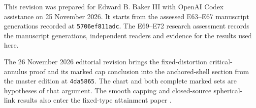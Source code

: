 \documentclass[11pt]{article}
\numberwithin{equation}{section}
\theoremstyle{definition}
\theoremstyle{remark}
\begin{document}
This revision was prepared for Edward B. Baker III with OpenAI Codex
assistance on 25 November 2026. It starts from the assessed E63--E67 manuscript generations
recorded at \texttt{5706ef811adc}. The E69--E72 research assessment
records the manuscript generations, independent readers and evidence
for the results used here.

The 26 November 2026 editorial revision brings the fixed-distortion
critical-annulus proof and its marked cap conclusion into the
anchored-shell section from the master edition at \texttt{4da5865}.
The chart and both complete marked sets are hypotheses of that
argument. The smooth capping and closed-source spherical-link results
also enter the fixed-type attainment paper \cite{Baker2026BourAttainment}.



\end{document}
